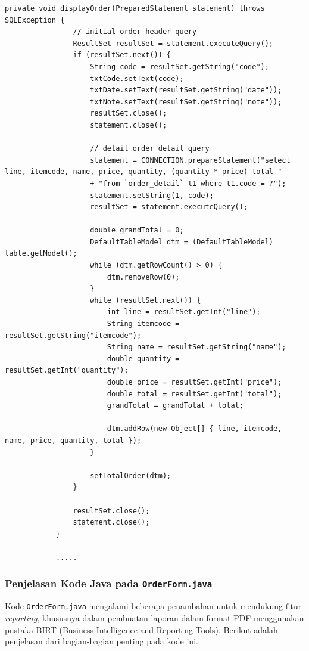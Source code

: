 \begin{lstlisting}[style=JavaStyle]
			private void displayOrder(PreparedStatement statement) throws SQLException {
				// initial order header query
				ResultSet resultSet = statement.executeQuery();
				if (resultSet.next()) {
					String code = resultSet.getString("code");
					txtCode.setText(code);
					txtDate.setText(resultSet.getString("date"));
					txtNote.setText(resultSet.getString("note"));
					resultSet.close();
					statement.close();
					
					// detail order detail query
					statement = CONNECTION.prepareStatement("select line, itemcode, name, price, quantity, (quantity * price) total "
					+ "from `order_detail` t1 where t1.code = ?");
					statement.setString(1, code);
					resultSet = statement.executeQuery();
					
					double grandTotal = 0;
					DefaultTableModel dtm = (DefaultTableModel) table.getModel();
					while (dtm.getRowCount() > 0) {
						dtm.removeRow(0);
					}
					while (resultSet.next()) {
						int line = resultSet.getInt("line");
						String itemcode = resultSet.getString("itemcode");
						String name = resultSet.getString("name");
						double quantity = resultSet.getInt("quantity");
						double price = resultSet.getInt("price");
						double total = resultSet.getInt("total");
						grandTotal = grandTotal + total;
						
						dtm.addRow(new Object[] { line, itemcode, name, price, quantity, total });
					}
					
					setTotalOrder(dtm);
				}
				
				resultSet.close();
				statement.close();
			}
			
			.....
\end{lstlisting}

		
\subsubsection{Penjelasan Kode Java pada \texttt{OrderForm.java}}

Kode \texttt{OrderForm.java} mengalami beberapa penambahan untuk mendukung fitur \textit{reporting}, khususnya dalam pembuatan laporan dalam format PDF menggunakan pustaka BIRT (Business Intelligence and Reporting Tools). Berikut adalah penjelasan dari bagian-bagian penting pada kode ini.


